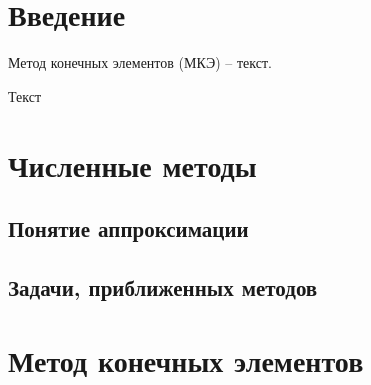 \section*{Введение} %

\begin{info} %
	Метод конечных элементов (МКЭ) -- текст.
\end{info}

Текст


\newpage

\section{Численные методы}

\subsection{Понятие аппроксимации}


\subsection{Задачи, приближенных методов}\label{sub_section_numerical_methods}


\newpage

\section{Метод конечных элементов}


\newpage

